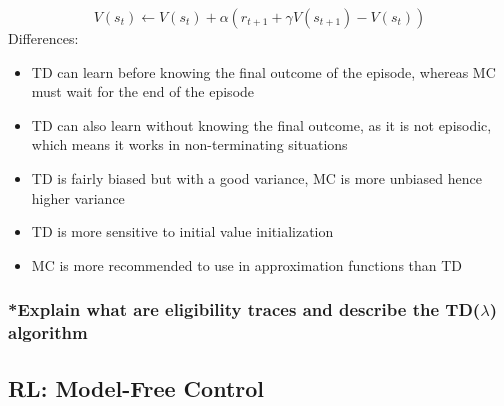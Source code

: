     $$
    V(s_t) \leftarrow V(s_t) + \alpha(r_{t+1} +\gamma V(s_{t+1}) - V(s_t))
    $$
    Differences:
    \begin{itemize}
        \item TD can learn before knowing the final outcome of the episode, whereas MC must wait for the end of the episode
        \item TD can also learn without knowing the final outcome, as it is not episodic, which means it works in non-terminating situations
        \item TD is fairly biased but with a good variance, MC is more unbiased hence higher variance
        \item TD is more sensitive to initial value initialization
        \item MC is more recommended to use in approximation functions than TD
    \end{itemize}

\subsubsection{*Explain what are eligibility traces and describe the TD($\lambda$) algorithm}

\subsection{RL: Model-Free Control}
